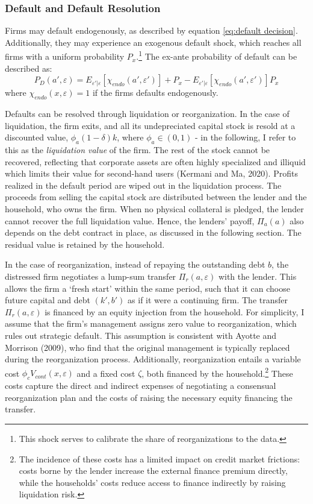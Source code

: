 \documentclass[12pt]{article}
\begin{document}
\subsubsection{Default and Default Resolution} \label{sec:default resolution}
Firms may default endogenously, as described by equation \ref{eq:default decision}. Additionally, they may experience an exogenous default shock, which reaches all firms with a uniform probability $P_{x}$.\footnote{This shock serves to calibrate the share of reorganizations to the data.} The ex-ante probability of default can be described as: 
\begin{equation} \label{eq:default probability}
 P_D(a', \varepsilon) = E_{\varepsilon'|\varepsilon}[\chi_{endo}(a',\varepsilon')] + P_{x} - E_{\varepsilon'|\varepsilon}[\chi_{endo}(a',\varepsilon')]P_{x}
\end{equation}
where $\chi_{endo}(x, \varepsilon) = 1$ if the firms defaults endogenously. 
 
Defaults can be resolved through liquidation or reorganization. In the case of liquidation, the firm exits, and all its undepreciated capital stock is resold at a discounted value, $\phi_a(1-\delta)k$, where $\phi_a \in (0,1)$ - in the following, I refer to this as the \textit{liquidation value} of the firm. The rest of the stock cannot be recovered, reflecting that corporate assets are often highly specialized and illiquid which limits their value for second-hand users (Kermani and Ma, 2020). Profits realized in the default period are wiped out in the liquidation process. The proceeds from selling the capital stock are distributed between the lender and the household, who owns the firm. When no physical collateral is pledged, the lender cannot recover the full liquidation value. Hence, the lenders' payoff, $\Pi_a(a)$ also depends on the debt contract in place, as discussed in the following section. The residual value is retained by the household.

In the case of reorganization, instead of repaying the outstanding debt $b$, the distressed firm negotiates a lump-sum transfer $\Pi_r(a,\varepsilon)$ with the lender. This allows the firm a `fresh start’ within the same period, such that it can choose future capital and debt $(k', b')$ as if it were a continuing firm. The transfer $\Pi_r(a,\varepsilon)$ is financed by an equity injection from the household. For simplicity, I assume that the firm’s management assigns zero value to reorganization, which rules out strategic default. This assumption is consistent with Ayotte and Morrison (2009), who find that the original management is typically replaced during the reorganization process. Additionally, reorganization entails a variable cost $\phi_c V_{cont}(x,\varepsilon)$ and a fixed cost $\zeta$, both financed by the household.\footnote{The incidence of these costs has a limited impact on credit market frictions: costs borne by the lender increase the external finance premium directly, while the households' costs reduce access to finance indirectly by raising liquidation risk.} These costs capture the direct and indirect expenses of negotiating a consensual reorganization plan and the costs of raising the necessary equity financing the transfer.
\end{document}
